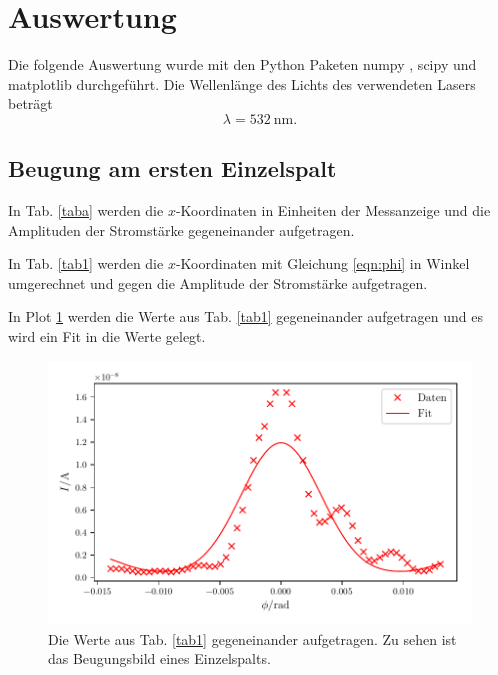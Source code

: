 \section{Auswertung}
\label{sec:Auswertung}

Die folgende Auswertung wurde mit den Python Paketen numpy \cite{numpy}, scipy \cite{scipy} und matplotlib \cite{matplotlib} durchgeführt. 
\newline
Die Wellenlänge des Lichts des verwendeten Lasers beträgt
\begin{equation*}
    \lambda = \SI{532}{\nano\meter}.
\end{equation*}
\subsection{Beugung am ersten Einzelspalt}
In Tab. \ref{taba} werden die $x$-Koordinaten in Einheiten der Messanzeige und die Amplituden der Stromstärke gegeneinander aufgetragen. 



\noindent In Tab. \ref{tab1} werden die $x$-Koordinaten mit Gleichung \eqref{eqn:phi} in Winkel umgerechnet und gegen die Amplitude der Stromstärke aufgetragen.



\noindent  In Plot \ref{fig:plot1} werden die Werte aus Tab. \ref{tab1} gegeneinander aufgetragen und es wird ein Fit in die Werte gelegt. 

\begin{figure}
    \centering
    \includegraphics[width=12cm, height=7cm]{build/plot1.pdf}
    \caption{Die Werte aus Tab. \ref{tab1} gegeneinander aufgetragen.
    Zu sehen ist das Beugungsbild eines Einzelspalts.}
    \label{fig:plot1}
\end{figure}

